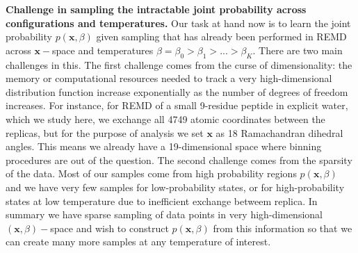 \textbf{Challenge in sampling the intractable joint probability across configurations and temperatures.} Our task at hand now is to learn the joint probability $p(\mathbf{x},\beta)$ given sampling that has already been performed in REMD across $\mathbf{x}-$space and temperatures $\beta = \beta_0 > \beta_1 > ... > \beta_K $. There are two main challenges in this. The first challenge comes from the curse of dimensionality: the memory or computational resources needed to track a very high-dimensional distribution function increase exponentially as the number of degrees of freedom increases. For instance, for REMD of a small 9-residue peptide in explicit water, which we study here, we exchange all 4749 atomic coordinates between the replicas, but for the purpose of analysis we set $\mathbf{x}$ as 18 Ramachandran dihedral angles. This means we already have a 19-dimensional space where binning procedures are out of the question. The second challenge comes from the sparsity of the data. Most of our samples come from high probability regions $p(\mathbf{x},\beta)$ and we have very few samples for low-probability states, or for high-probability states at low temperature due to inefficient exchange betweem replica. In summary we have sparse sampling of data points in very high-dimensional $(\mathbf{x},\beta)-$space and wish to construct $p(\mathbf{x},\beta)$ from this information so that we can create many more samples at any temperature of interest.

